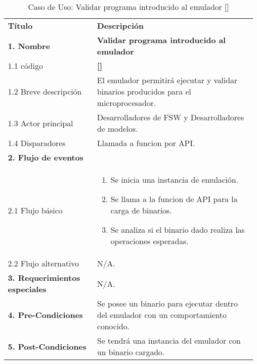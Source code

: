 \documentclass[
  11pt, %
  codirector, %
]{charter}
\makeatletter
\newcommand{\mytwodigits}[1]{\two@digits{#1}}
\newcounter{reqCounter}
\makeatother
\begin{document}

\begin{table}[h!]
	\caption{Caso de Uso: Validar programa introducido al emulador [\CODrequerimiento\mytwodigits{\value{reqCounter}}]}
	\centering
	\begin{tabular}{ | m{4.0cm} | m{10cm} | }
		\hline
		\rowcolor{gray!50} %
		\textbf{Título} & \textbf{Descripción} \\ %
		\textbf{1. Nombre} & \textbf{Validar programa introducido al emulador} \\
		1.1 código &\textbf{[\CODrequerimiento\mytwodigits{\value{reqCounter}}]} \\
		1.2 Breve descripción & El emulador permitirá ejecutar y validar binarios producidos para el microprocesador. \\
		1.3 Actor principal & Desarrolladores de FSW y Desarrolladores de modelos. \\
		1.4 Disparadores & Llamada a funcion por API. \\ \hline
		\textbf{2. Flujo de eventos} &  \\
		2.1 Flujo básico &
		\begin{enumerate}
			\item Se inicia una instancia de emulación.
      \item Se llama a la funcion de API para la carga de binarios.
      \item Se analiza si el binario dado realiza las operaciones esperadas.
		\end{enumerate} \\
		2.2 Flujo alternativo & N/A. \\ \hline
		\textbf{3. Requerimientos especiales} & N/A. \\ \hline
		\textbf{4. Pre-Condiciones} & Se posee un binario para ejecutar dentro del emulador con un comportamiento conocido. \\ \hline
		\textbf{5. Post-Condiciones} & Se tendrá una instancia del emulador con un binario cargado. \\ \hline
	\end{tabular}

\end{table}

\end{document}
